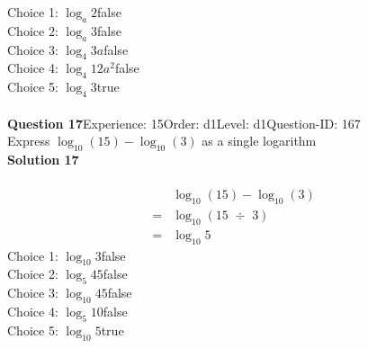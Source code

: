 \documentclass{article}
\begin{document}
Choice 1: \hspace{20pt}$\log_{a}2$\hspace{20pt}false\\
Choice 2: \hspace{20pt}$\log_{a}3$\hspace{20pt}false\\
Choice 3: \hspace{20pt}$\log_{4}3a$\hspace{20pt}false\\
Choice 4: \hspace{20pt}$\log_{4}12a^2$\hspace{20pt}false\\
Choice 5: \hspace{20pt}$\log_{4}3$\hspace{20pt}true\\
\\[4pt]
\noindent\textbf{Question 17}\hspace{20pt}Experience: 15\hspace{20pt}Order: d1\hspace{20pt}Level: d1\hspace{20pt}Question-ID: 167\\[2pt]
Express $\log_{10}(15)-\log_{10}(3)$ as a single logarithm\\[4pt]
\noindent\textbf{Solution 17}\\[2pt]
\\[-35pt]\begin{align*}
&\log_{10}(15)-\log_{10}(3)\\[2pt]
=&\log_{10}(15 \,\, \div \,\, 3)\\[2pt]
=&\log_{10}5
\end{align*}
Choice 1: \hspace{20pt}$\log_{10}3$\hspace{20pt}false\\
Choice 2: \hspace{20pt}$\log_{5}45$\hspace{20pt}false\\
Choice 3: \hspace{20pt}$\log_{10}45$\hspace{20pt}false\\
Choice 4: \hspace{20pt}$\log_{5}10$\hspace{20pt}false\\
Choice 5: \hspace{20pt}$\log_{10}5$\hspace{20pt}true\\
\end{document}
